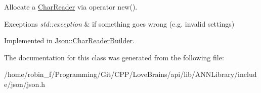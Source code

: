 Allocate a \hyperlink{class_json_1_1_char_reader}{Char\+Reader} via operator new(). 


\begin{DoxyExceptions}{Exceptions}
{\em std\+::exception} & if something goes wrong (e.\+g. invalid settings) \\
\hline
\end{DoxyExceptions}


Implemented in \hyperlink{class_json_1_1_char_reader_builder_a3e3c9f4aeb07023ef0c5f6255003078a}{Json\+::\+Char\+Reader\+Builder}.



The documentation for this class was generated from the following file\+:\begin{DoxyCompactItemize}
\item 
/home/robin\+\_\+f/\+Programming/\+Git/\+C\+P\+P/\+Love\+Brains/api/lib/\+A\+N\+N\+Library/include/json/json.\+h\end{DoxyCompactItemize}
